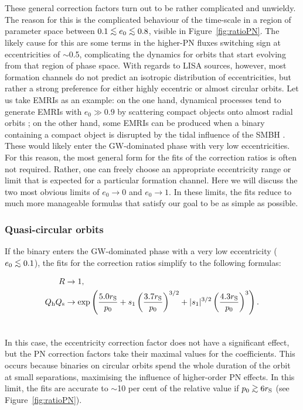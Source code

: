 \documentclass[usenatbib]{mnras}
\def\lsim{\mathrel{\rlap{\lower 3pt \hbox{$\sim$}} \raise 2.0pt \hbox{$<$}}}
\def\gsim{\mathrel{\rlap{\lower 3pt \hbox{$\sim$}} \raise 2.0pt \hbox{$>$}}}
\begin{document}
These general correction factors turn out to be rather complicated and unwieldy. The reason for this is the complicated behaviour of the time-scale in a region of parameter space between $0.1 \lsim e_0 \lsim 0.8$, visible in Figure~\ref{fig:ratioPN}. The likely cause for this are some terms in the higher-PN fluxes switching sign at eccentricities of $\sim$0.5, complicating the dynamics for orbits that start evolving from that region of phase space. With regards to LISA sources, however, most formation channels do not predict an isotropic distribution of eccentricities, but rather a strong preference for either highly eccentric or almost circular orbits. Let us take EMRIs as an example: on the one hand, dynamical processes tend to generate EMRIs with $e_0 \gg 0.9$ by scattering compact objects onto almost radial orbits \citep[see, e.g.][]{Amaro-Seoane2007,pau_2013}; on the other hand, some EMRIs can be produced when a binary containing a compact object is disrupted by the tidal influence of the SMBH \citep[see, e.g.][]{Amaro_Seoane_2019}. These would likely enter the GW-dominated phase with very low eccentricities. For this reason, the most general form for the fits of the correction ratios is often not required. Rather, one can freely choose an appropriate eccentricity range or limit that is expected for a particular formation channel. Here we will discuss the two most obvious limits of $e_0 \to 0$ and $e_0 \to 1$. In these limits, the fits reduce to much more manageable formulas that satisfy our goal to be as simple as possible.

\subsubsection{Quasi-circular orbits}

If the binary enters the GW-dominated phase with a very low eccentricity ($e_0 \lsim 0.1 $), the fits for the correction ratios simplify to the following formulas:

\begin{align}
    R &\to 1, \\
    Q_{\rm h}Q_{\rm s} &\to \exp \left( \frac{5.0 r_{\rm S}}{p_0} + s_1\left( \frac{3.7 r_{\rm S}}{p_0}\right) ^{3/2} + \lvert s_1 \rvert ^{3/2}\left( \frac{4.3 r_{\rm S}}{p_0}\right) ^{3} \right). \label{eq:r3} \\ \nonumber
\end{align}

In this case, the eccentricity correction factor does not have a significant effect, but the PN correction factors take their maximal values for the coefficients. This occurs because binaries on circular orbits spend the whole duration of the orbit at small separations, maximising the influence of higher-order PN effects. In this limit, the fits are accurate to $\sim$10 per cent of the relative value if $p_0 \gsim 6 r_{\rm S}$ (see Figure~\ref{fig:ratioPN}).
\end{document}
